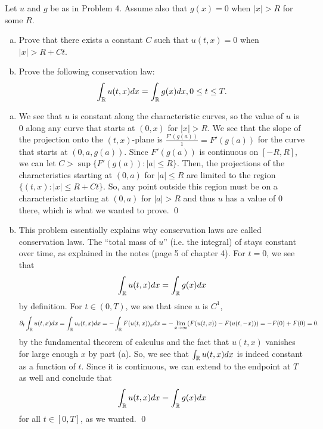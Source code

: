 \documentclass{article}
\renewcommand{\d}{\partial}
\begin{document}
\newpage
{}  Let $u$ and $g$ be as in Problem 4. Assume also that $g(x) = 0$ when $|x| > R$ for
some $R$.
\begin{enumerate}[(a)]
    \item Prove that there exists a constant $C$ such that $u(t, x) = 0$ when $|x|> R + Ct$.
    \item Prove the following conservation law:
    \[\int_{\mathbb{R}} u(t, x)dx = \int_{\mathbb{R}} g(x)dx, 0 \le t \le T.\]
\end{enumerate}
\tri
\hop
\solution
\begin{enumerate}[(a)]
    \item We see that $u$ is constant along the characteristic curves, so the value of $u$ is $0$ along any curve that starts at $(0,x)$ for $|x| > R$. We see that the slope of the projection onto the $(t,x)$-plane is $\frac{F'(g(a))}{1} = F'(g(a))$ for the curve that starts at $(0, a, g(a))$. Since $F'(g(a))$ is continuous on $[-R, R]$, we can let $C > \sup \{F'(g(a)) : |a| \le R \}$. Then, the projections of the characteristics starting at $(0,a)$ for $|a| \le R$ are limited to the region $\{(t,x): |x| \le R+Ct\}$. So, any point outside this region must be on a characteristic starting at  $(0,a)$ for $|a| > R$ and thus $u$ has a value of 0 there, which is what we wanted to prove. \qed 
    \item This problem essentially explains why conservation laws are called conservation laws. The ``total mass of $u$'' (i.e. the integral) of stays constant over time, as explained in the notes (page 5 of chapter 4).
    \hop 
    For $t = 0$, we see that 
    \[\int_{\mathbb{R}} u(t,x)dx = \int_{\mathbb{R}} g(x) dx\]
    by definition. For $t \in (0,T)$, we see that since $u$ is $C^1$, 
    \[\d_t\int_\RR u(t,x)dx = \int_\RR u_t(t,x)dx = -\int_\RR F(u(t,x))_x dx  =  -\lim_{x \to \infty}( F(u(t,x)) - F(u(t,-x)))= -F(0) +F(0) =0.\]
    by the fundamental theorem of calculus and the fact that $u(t,x)$ vanishes for large enough $x$ by part (a). 
    \hop
    So, we see that $\int_{\mathbb{R}} u(t,x)dx$ is indeed constant as a function of $t$. Since it is continuous, we can extend to the endpoint at $T$ as well and conclude that 
    \[\int_{\mathbb{R}} u(t,x)dx = \int_{\mathbb{R}} g(x) dx\]
    for all $t \in [0,T]$, as we wanted. \qed
\end{enumerate}
\end{document}
